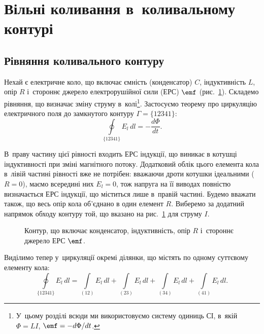 \section{Вільні коливання в~коливальному контурі}\hypertarget{free-oscillations}{}

\subsection*{Рівняння коливального контуру}

Нехай є електричне коло, що включає ємність (конденсатор) $C$, індуктивність $L$, опір $R$ і~стороннє джерело електрорушійної сили (ЕРС) $\emf$ (рис.~\ref{tikz:LCR_circuit}). Складемо рівняння, що визначає зміну струму в~колі\footnote{У~цьому розділі всюди ми використовуємо систему одиниць СІ, в~якій $\Phi = LI$, $\emf = -d\Phi/dt$.}. Застосуємо теорему про циркуляцію електричного поля до замкнутого контуру $\Gamma = \{12341\}$:
\begin{equation}\label{eq:circulation}
	\oint\limits_{\{12341\}} E_l \, dl = -\frac{d\Phi}{dt}.
\end{equation}

В~праву частину цієї рівності входить ЕРС індукції, що виникає в
котушці індуктивності при зміні магнітного потоку. Додатковий
облік цього елемента кола в~лівій частині рівності вже не
потрібен: вважаючи дроти котушки ідеальними ($R = 0$), маємо всередині них $E_l = 0$, тож напруга на її виводах повністю
визначається ЕРС індукції, що міститься лише в~правій частині. Будемо вважати також, що весь опір кола об'єднано в
один елемент $R$. Виберемо за додатний напрямок обходу контуру
той, що вказано на рис.~\ref{tikz:LCR_circuit} для струму $I$.

\begin{figure}[h!]
	\centering
	\caption{Контур, що включає конденсатор, індуктивність, опір $R$ і~стороннє джерело ЕРС $\emf$.}
	\label{tikz:LCR_circuit}
\end{figure}

Виділимо тепер у~циркуляції окремі ділянки, що містять по
одному суттєвому елементу кола:
\begin{equation*}
	\oint\limits_{\{12341\}} E_l \, dl
	= \int\limits_{(12)} E_l \, dl
	+ \int\limits_{(23)} E_l \, dl
	+ \int\limits_{(34)} E_l \, dl
	+ \int\limits_{(41)} E_l \, dl.
\end{equation*}


